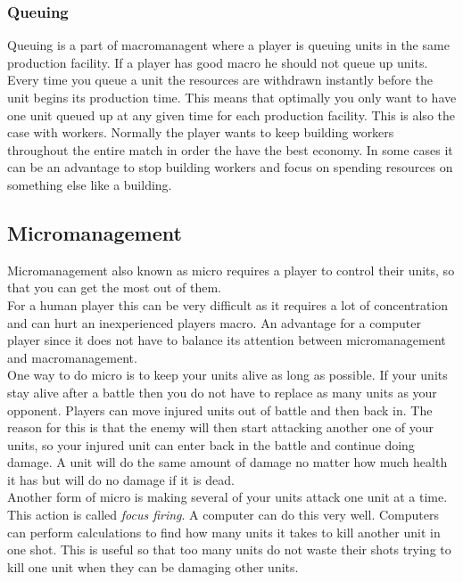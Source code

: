 			\subsubsection{Queuing}
				Queuing is a part of macromanagent where a player is queuing units in the same production facility.	If a player has good macro he should not queue up units. 
				Every time you queue a unit the resources are withdrawn instantly before the unit begins its production time. This means that optimally you only want to have one unit
 				queued up at any given time for each production facility. This is also the case with workers. Normally the player wants to keep building workers throughout the entire match
				in order the have the best economy. In some cases it can be an advantage to stop building workers and focus on spending resources on something else like a building.
				
				
	\subsection{Micromanagement}
		Micromanagement also known as micro requires a player to control their units, so that you can get the most out of them.\\
		
		For a human player this can be very difficult as it requires a lot of concentration and can hurt an inexperienced players macro. 
		An advantage for a computer player since it does not have to balance its attention between micromanagement and macromanagement.\\
		
		One way to do micro is to keep your units alive as long as possible. 
		If your units stay alive after a battle then you do not have to replace as many units as your opponent. 
		Players can move injured units out of battle and then back in. 
		The reason for this is that the enemy will then start attacking another one of your 
		units, so your injured unit can enter back in the battle and continue doing damage. 
		A unit will do the same amount of damage no matter how much health it has but will do no damage if it is dead.\\
		
		Another form of micro is making several of your units attack one unit at a time. This action is called \textit{focus firing}.
		A computer can do this very well. Computers can perform calculations to find how many units it takes to kill another unit in one shot.
		This is useful so that too many units do not waste their shots trying to kill one unit when they can be damaging other units.\\

